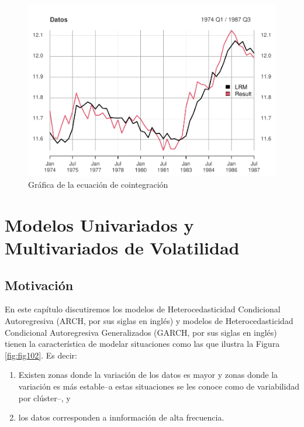 \documentclass[
]{book}
\begin{document}
\begin{figure}

{\centering \includegraphics[width=0.95\linewidth]{Notas-Series-Tiempo_files/figure-latex/fig92-1} 

}

\caption{Gráfica de la ecuación de cointegración}\label{fig:fig92}
\end{figure}

\hypertarget{modelos-univariados-y-multivariados-de-volatilidad}{%
\chapter{Modelos Univariados y Multivariados de Volatilidad}\label{modelos-univariados-y-multivariados-de-volatilidad}}

\hypertarget{motivaciuxf3n-1}{%
\section{Motivación}\label{motivaciuxf3n-1}}

En este capítulo discutiremos los modelos de Heterocedasticidad Condicional Autoregresiva (ARCH, por sus siglas en inglés) y modelos de Heterocedasticidad Condicional Autoregresiva Generalizados (GARCH, por sus siglas en inglés) tienen la característica de modelar situaciones como las que ilustra la Figura \ref{fig:fig102}. Es decir:

\begin{enumerate}
\def\labelenumi{\arabic{enumi})}
\item
  Existen zonas donde la variación de los datos es mayor y zonas donde la variación es más estable--a estas situaciones se les conoce como de variabilidad por clúster--, y
\item
  los datos corresponden a innformación de alta frecuencia.
\end{enumerate}
\end{document}
